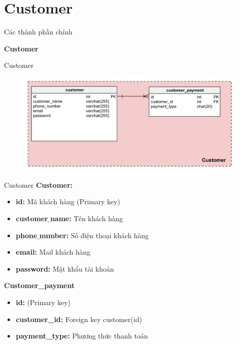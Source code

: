 \documentclass[aspectratio=43,xcolor=dvipsnames]{beamer}
\begin{document}
	\section{Customer}
	\begin{frame}{Các thành phần chính}
		\tableofcontents
	\end{frame}
	\begin{frame}
		\textcolor{structure}{\Huge{\textbf{Customer}}}
	\end{frame}
	\begin{frame}{Customer}
		\begin{figure}[ht!]
			\centerline{\includegraphics[width=1\textwidth]{customer.png}}
			\label{fig:ass1}
		\end{figure}
	\end{frame}
	\begin{frame}{Customer}
		\textcolor{structure}{\large{\textbf{Customer:}}}
		\begin{itemize}
			\item \textbf{id:} Mã khách hàng (Primary key)
			\item \textbf{customer$\_$name:} Tên khách hàng
			\item \textbf{phone$\_$number:} Số điện thoại khách hàng
			\item \textbf{email:} Mail khách hàng
			\item \textbf{password:} Mật khẩu tài khoản
		\end{itemize}
		\textcolor{structure}{\large{\textbf{Customer\_payment}}}
		\begin{itemize}
			\item \textbf{id:} (Primary key)
			\item \textbf{customer\_id:} Foreign key customer(id)
			\item \textbf{payment\_type:} Phương thức thanh toán
		\end{itemize}
	\end{frame}
\end{document}
